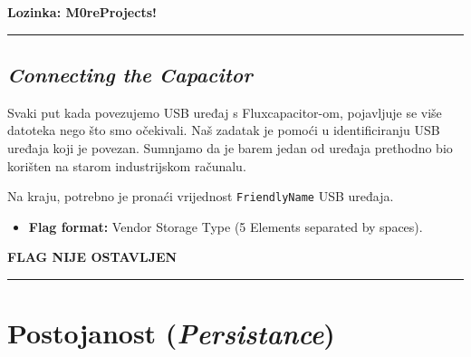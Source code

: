 \documentclass{article}
\begin{document}
\begin{center}
    \textbf{Lozinka: M0reProjects!}
\end{center}

\noindent\rule{\textwidth}{0.4pt}

\subsection{\textit{Connecting the Capacitor}}
\begin{tcolorbox}[
    colback=gray!5,  %
    colframe=gray!75,  %
    title=\textbf{Zadatak}]
    Svaki put kada povezujemo USB uređaj s Fluxcapacitor-om, pojavljuje se više datoteka nego što smo očekivali. Naš zadatak je pomoći u identificiranju USB uređaja koji je povezan. Sumnjamo da je barem jedan od uređaja prethodno bio korišten na starom industrijskom računalu.
    
    Na kraju, potrebno je pronaći vrijednost \texttt{FriendlyName} USB uređaja.
\end{tcolorbox}

\begin{itemize}
    \item \textbf{Flag format:} Vendor Storage Type (5 Elements separated by spaces).
\end{itemize}
\begin{center}
    \textbf{FLAG NIJE OSTAVLJEN}
\end{center}


\noindent\rule{\textwidth}{0.4pt}



\newpage
\section{Postojanost (\textit{Persistance})}
\label{sec:persist}
\end{document}
